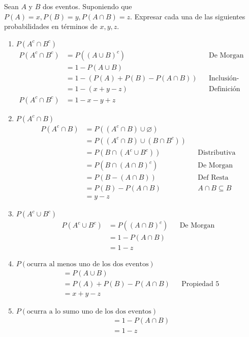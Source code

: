 \item Sean $A$ y $B$ dos eventos. Suponiendo que $P(A)=x,P(B)=y,P(A\cap B)=z$. Expresar cada una de las siguientes probabilidades en términos de $x,y,z$.
    \begin{enumerate}
        \item $P(A^c\cap B^c)$
            \begin{align*}
                P(A^c\cap B^c)&=P((A\cup B)^c)&&\text{De Morgan}\\
                &=1-P(A\cup B)\\
                &=1-(P(A)+P(B)-P(A\cap B))&&\text{Inclusión-exclusión}\\
                &=1-(x+y-z)&&\text{Definición}\\
                P(A^c\cap B^c)&=1-x-y+z
            \end{align*}
        \item $P(A^c\cap B)$
            \begin{align*}
                P(A^c\cap B)&=P((A^c\cap B) \cup\varnothing)\\
                &=P((A^c\cap B)\cup(B\cap B^c))\\
                &=P(B\cap(A^c\cup B^c))&&\text{Distributiva}\\
                &=P(B\cap(A\cap B)^c)&&\text{De Morgan}\\
                &=P(B-(A\cap B))&&\text{Def Resta}\\
                &=P(B)-P(A\cap B)&&A\cap B\subseteq B\\
                &=y-z
            \end{align*}
        \item $P(A^c\cup B^c)$
            \begin{align*}
                P(A^c\cup B^c)&=P((A\cap B)^c)&&\text{De Morgan}\\
                &=1-P(A\cap B)\\
                &=1-z
            \end{align*}
        \item $P(\text{ocurra al menos uno de los dos eventos})$
            \begin{align*}
                &=P(A\cup B)\\
                &=P(A)+P(B)-P(A\cap B)&&\text{Propiedad 5}\\
                &=x+y-z
            \end{align*}
        \item $P(\text{ocurra a lo sumo uno de los dos eventos})$
            \begin{align*}
                &=1-P(A\cap B)\\
                &=1-z
            \end{align*}
    \end{enumerate}